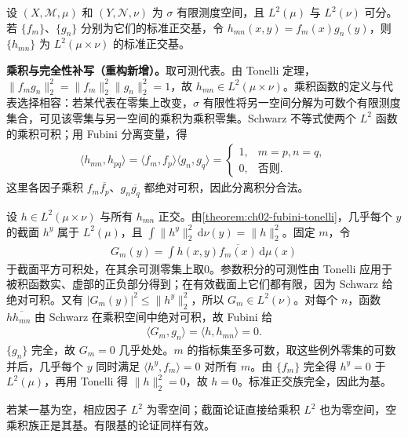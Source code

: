 \documentclass[../../main.tex]{subfiles}
\begin{document}
\begin{exercise}\label{exercise:ch05-product-orthonormal-basis}
设 $(X,\mathscr M,\mu)$ 和 $(Y,\mathscr N,\nu)$ 为 $\sigma$ 有限测度空间，且 $L^2(\mu)$ 与 $L^2(\nu)$ 可分。若 $\{f_m\}$、$\{g_n\}$ 分别为它们的标准正交基，令 $h_{mn}(x,y)=f_m(x)g_n(y)$，则 $\{h_{mn}\}$ 为 $L^2(\mu\times\nu)$ 的标准正交基。
\end{exercise}
\begin{solution}
\textbf{乘积与完全性补写（重构新增）。}取可测代表。由 Tonelli 定理，$\|f_mg_n\|_2^2=\|f_m\|_2^2\|g_n\|_2^2=1$，故 $h_{mn}\in L^2(\mu\times\nu)$。乘积函数的定义与代表选择相容：若某代表在零集上改变，$\sigma$ 有限性将另一空间分解为可数个有限测度集合，可见该零集与另一空间的乘积为乘积零集。Schwarz 不等式使两个 $L^2$ 函数的乘积可积；用 Fubini 分离变量，得
\begin{align*}
\langle h_{mn},h_{pq}\rangle
=\langle f_m,f_p\rangle\langle g_n,g_q\rangle
=\begin{cases}1,&m=p, n=q,\\0,&\text{否则}.
\end{cases}
\end{align*}
这里各因子乘积 $f_m\overline{f_p}$、$g_n\overline{g_q}$ 都绝对可积，因此分离积分合法。

设 $h\in L^2(\mu\times\nu)$ 与所有 $h_{mn}$ 正交。由\cref{theorem:ch02-fubini-tonelli}，几乎每个 $y$ 的截面 $h^y$ 属于 $L^2(\mu)$，且 $\int\|h^y\|_2^2\,\mathrm d\nu(y)=\|h\|_2^2$。固定 $m$，令
\begin{align*}
G_m(y)=\int h(x,y)\overline{f_m(x)}\,\mathrm d\mu(x)
\end{align*}
于截面平方可积处，在其余可测零集上取0。参数积分的可测性由 Tonelli 应用于被积函数实、虚部的正负部分得到；在有效截面上它们都有限，因为 Schwarz 给绝对可积。又有 $|G_m(y)|^2\leqslant\|h^y\|_2^2$，所以 $G_m\in L^2(\nu)$。对每个 $n$，函数 $h\overline{h_{mn}}$ 由 Schwarz 在乘积空间中绝对可积，故 Fubini 给
\begin{align*}
\langle G_m,g_n\rangle=\langle h,h_{mn}\rangle=0.
\end{align*}
$\{g_n\}$ 完全，故 $G_m=0$ 几乎处处。$m$ 的指标集至多可数，取这些例外零集的可数并后，几乎每个 $y$ 同时满足 $\langle h^y,f_m\rangle=0$ 对所有 $m$。由 $\{f_m\}$ 完全得 $h^y=0$ 于 $L^2(\mu)$，再用 Tonelli 得 $\|h\|_2^2=0$，故 $h=0$。标准正交族完全，因此为基。

若某一基为空，相应因子 $L^2$ 为零空间；截面论证直接给乘积 $L^2$ 也为零空间，空乘积族正是其基。有限基的论证同样有效。
\end{solution}
\end{document}
